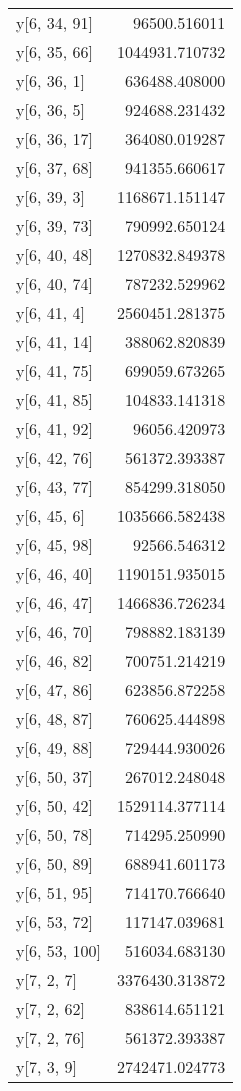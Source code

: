 \begin{longtable}{lr}
y[6, 34, 91] & 96500.516011 \\
y[6, 35, 66] & 1044931.710732 \\
y[6, 36, 1] & 636488.408000 \\
y[6, 36, 5] & 924688.231432 \\
y[6, 36, 17] & 364080.019287 \\
y[6, 37, 68] & 941355.660617 \\
y[6, 39, 3] & 1168671.151147 \\
y[6, 39, 73] & 790992.650124 \\
y[6, 40, 48] & 1270832.849378 \\
y[6, 40, 74] & 787232.529962 \\
y[6, 41, 4] & 2560451.281375 \\
y[6, 41, 14] & 388062.820839 \\
y[6, 41, 75] & 699059.673265 \\
y[6, 41, 85] & 104833.141318 \\
y[6, 41, 92] & 96056.420973 \\
y[6, 42, 76] & 561372.393387 \\
y[6, 43, 77] & 854299.318050 \\
y[6, 45, 6] & 1035666.582438 \\
y[6, 45, 98] & 92566.546312 \\
y[6, 46, 40] & 1190151.935015 \\
y[6, 46, 47] & 1466836.726234 \\
y[6, 46, 70] & 798882.183139 \\
y[6, 46, 82] & 700751.214219 \\
y[6, 47, 86] & 623856.872258 \\
y[6, 48, 87] & 760625.444898 \\
y[6, 49, 88] & 729444.930026 \\
y[6, 50, 37] & 267012.248048 \\
y[6, 50, 42] & 1529114.377114 \\
y[6, 50, 78] & 714295.250990 \\
y[6, 50, 89] & 688941.601173 \\
y[6, 51, 95] & 714170.766640 \\
y[6, 53, 72] & 117147.039681 \\
y[6, 53, 100] & 516034.683130 \\
y[7, 2, 7] & 3376430.313872 \\
y[7, 2, 62] & 838614.651121 \\
y[7, 2, 76] & 561372.393387 \\
y[7, 3, 9] & 2742471.024773 \\

\end{longtable}
